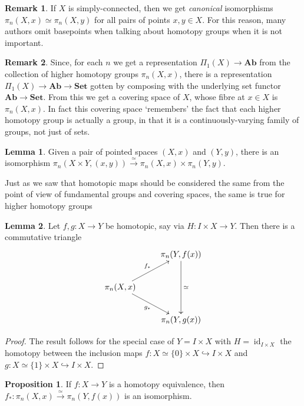 \documentclass{tufte-handout}
\def\into {\hookrightarrow}
\def\Set {\mathbf{Set}}
\def\Ab {\mathbf{Ab}}
\DeclareMathOperator{\id}{id}
\theoremstyle{definition}
\newtheorem{prop}{Proposition}
\newtheorem{lemma}{Lemma}
\newtheorem*{rem}{Remark}
\begin{document}
\begin{rem}
If $X$ is simply-connected, then we get \emph{canonical} isomorphisms $\pi_n(X,x) \simeq \pi_n(X,y)$ for all pairs of points $x,y\in X$. For this reason, many authors omit basepoints when talking about homotopy groups when it is not important.
\end{rem}

\begin{rem}
Since, for each $n$ we get a representation $\Pi_1(X) \to \Ab$ from the collection of higher homotopy groups $\pi_n(X,x)$, there is a representation $\Pi_1(X) \to \Ab \to \Set$ gotten by composing with the underlying set functor $\Ab \to \Set$. From this we get a covering space of $X$, whose fibre at $x\in X$ is $\pi_n(X,x)$. In fact this covering space `remembers' the fact that each higher homotopy group is actually a group, in that it is a continuously-varying family of groups, not just of sets.
\end{rem}

\begin{lemma}
Given a pair of pointed spaces $(X,x)$ and $(Y,y)$, there is an isomorphism $\pi_n(X\times Y,(x,y)) \xrightarrow{\simeq} \pi_n(X,x) \times \pi_n(Y,y)$.
\end{lemma}

Just as we saw that homotopic maps should be considered the same from the point of view of fundamental groups and covering spaces, the same is true for higher homotopy groups

\begin{lemma}
Let $f,g\colon X\to Y$ be homotopic, say via $H\colon I\times X \to Y$. Then there is a commutative triangle
\[
  \xymatrix{
    & \pi_n(Y,f(x)) \ar[dd]^{\simeq}\\
    \pi_n(X,x) \ar[ur]^{f_*} \ar[dr]_{g_*} \\
    & \pi_n(Y,g(x))
  }
\]
\end{lemma}
\begin{proof}
The result follows for the special case of $Y = I\times X$ with $H=\id_{I\times X}$ the homotopy between the inclusion maps $f\colon X\simeq \{0\}\times X \into I \times X$ and $g\colon X\simeq \{1\}\times X \into I \times X$.

\end{proof}

\begin{prop}
If $f\colon X\to Y$ is a homotopy equivalence, then $f_*\colon \pi_n(X,x) \xrightarrow{\simeq} \pi_n(Y,f(x))$ is an isomorphism.
\end{prop}
\end{document}
